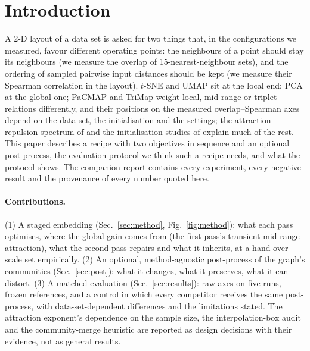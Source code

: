 \documentclass[10pt,twocolumn]{article}
\begin{document}
\section{Introduction}
A 2-D layout of a data set is asked for two things that, in the configurations we measured, favour different
operating points: the neighbours of a point should stay its neighbours (we measure the overlap of
15-nearest-neighbour sets), and the ordering of sampled pairwise input distances should be kept (we measure their
Spearman correlation in the layout). $t$-SNE \citep{vandermaaten2008tsne, vandermaaten2014bh} and UMAP
\citep{mcinnes2018umap} sit at the local end; PCA at the global one; PaCMAP and TriMap \citep{wang2021pacmap,
amid2019trimap} weight local, mid-range or triplet relations differently, and their positions on the measured
overlap--Spearman axes depend on the data set, the initialisation and the settings; the attraction--repulsion
spectrum of \citet{bohm2022spectrum} and the initialisation studies of \citet{kobak2021init} explain much of the
rest. This paper describes a recipe with two objectives in sequence and an optional post-process, the evaluation
protocol we think such a recipe needs, and what the protocol shows. The companion report
\citep{chenebaux2026report} contains every experiment, every negative result and the provenance of every number
quoted here.

\paragraph{Contributions.} (1) A staged embedding (Sec.~\ref{sec:method}, Fig.~\ref{fig:method}): what each pass
optimises, where the global gain comes from (the first pass's transient mid-range attraction), what the second
pass repairs and what it inherits, at a hand-over scale set empirically. (2) An optional, method-agnostic
post-process of the graph's communities (Sec.~\ref{sec:post}): what it changes, what it preserves, what it can
distort. (3) A matched evaluation (Sec.~\ref{sec:results}): raw axes on five runs, frozen references, and a
control in which every competitor receives the same post-process, with data-set-dependent differences and the
limitations stated. The attraction exponent's dependence on the sample size, the interpolation-box audit and the
community-merge heuristic are reported as design decisions with their evidence, not as general results.
\end{document}
